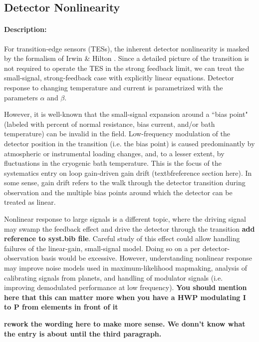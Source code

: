 \subsection{Detector Nonlinearity}
\label{det_nonlinearity}

\paragraph{Description:}
For transition-edge sensors (TESs), the inherent detector nonlinearity is masked by the formalism of Irwin \& Hilton \cite{Irwin_Hilton}. Since a detailed picture of the transition is not required to operate the TES in the strong feedback limit, we can treat the small-signal, strong-feedback case with explicitly linear equations. Detector response to changing temperature and current is parametrized with the parameters $\alpha$ and $\beta$.

However, it is well-known that the small-signal expansion around a ``bias point" (labeled with percent of normal resistance, bias current, and/or bath temperature) can be invalid in the field. Low-frequency modulation of the detector position in the transition (i.e. the bias point) is caused predominantly by atmospheric or instrumental loading changes, and, to a lesser extent, by fluctuations in the cryogenic bath temperature. This is the focus of the systematics entry on loop gain-driven gain drift (textbf{reference section here}). In some sense, gain drift refers to the walk through the detector transition during observation and the multiple bias points around which the detector can be treated as linear.

Nonlinear response to large signals is a different topic, where the driving signal may swamp the feedback effect and drive the detector through the transition \cite{Rostem} \textbf{add reference to syst.bib file}. Careful study of this effect could allow handling failures of the linear-gain, small-signal model. Doing so on a per detector-observation basis would be excessive. However, understanding nonlinear response may improve noise models used in maximum-likelihood mapmaking, analysis of calibrating signals from planets, and handling of modulator signals (i.e. improving demodulated performance at low frequency). \textbf{You should mention here that this can matter more when you have a HWP modulating I to P from elements in front of it}

\textbf{rework the wording here to make more sense. We donn't know what the entry is about until the third paragraph.}

